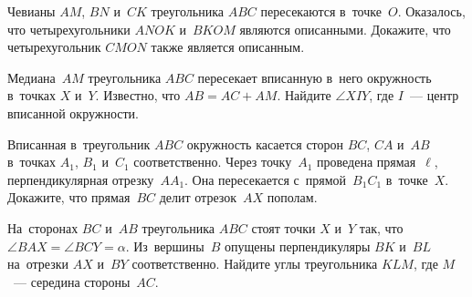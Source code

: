 \begin{problems}
\item
Чевианы $AM$, $BN$ и~$CK$ треугольника $ABC$ пересекаются в~точке~$O$.
Оказалось, что четырехугольники $ANOK$ и~$BKOM$ являются описанными.
Докажите, что четырехугольник $CMON$ также является описанным.

\item
Медиана~$AM$ треугольника $ABC$ пересекает вписанную в~него окружность
в~точках $X$ и~$Y$.
Известно, что $AB = AC + AM$.
Найдите $\angle XIY$, где $I$~--- центр вписанной окружности.

\item
Вписанная в~треугольник $ABC$ окружность касается сторон $BC$, $CA$ и~$AB$
в~точках $A_1$, $B_1$ и~$C_1$ соответственно.
Через точку~$A_1$ проведена прямая~$\ell$, перпендикулярная отрезку~$A A_1$.
Она пересекается с~прямой~$B_1 C_1$ в~точке~$X$.
Докажите, что прямая~$BC$ делит отрезок~$AX$ пополам.

\item
На~сторонах $BC$ и~$AB$ треугольника $ABC$ стоят точки $X$ и~$Y$ так, что
$\angle BAX = \angle BCY = \alpha$.
Из~вершины~$B$ опущены перпендикуляры $BK$ и~$BL$ на~отрезки $AX$ и~$BY$
соответственно.
Найдите углы треугольника $KLM$, где $M$~--- середина стороны~$AC$.

\end{problems}

